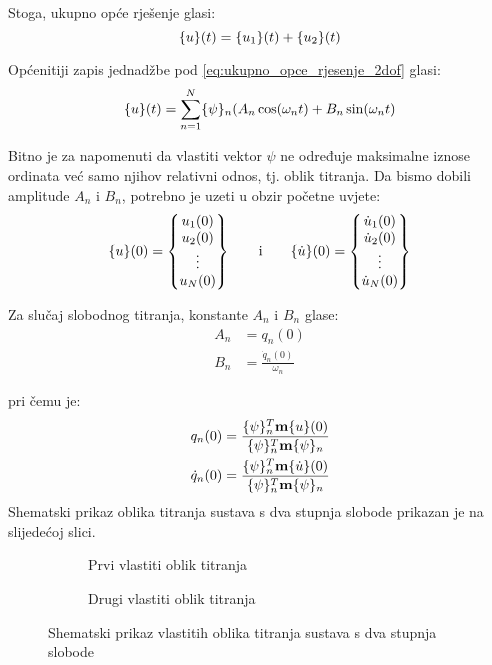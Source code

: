 Stoga, ukupno opće rješenje glasi:
\begin{equation}\label{eq:ukupno_opce_rjesenje_2dof}
    \vtor{u}{}(t)=\vtor{u_1}{}(t)+\vtor{u_2}{}(t) 
\end{equation}

Općenitiji zapis jednadžbe pod \eqref{eq:ukupno_opce_rjesenje_2dof} glasi:
\begin{equation}\label{eq:ukupno_opce_rjesenje_mdof}
    \vtor{u}{}(t)=\sum_{n=1}^N \vtor{\psi}{}_n (A_n\cos(\omega_nt) + B_n\sin(\omega_nt)
\end{equation}

\newpage
Bitno je za napomenuti da vlastiti vektor $\psi$ ne određuje maksimalne iznose
ordinata već samo njihov relativni odnos, tj. oblik titranja. Da
bismo dobili amplitude $A_n$ i $B_n$, potrebno je uzeti u obzir početne uvjete:
\begin{equation}
    \vtor{u}{}(0)  = \begin{Bmatrix} u_1(0)\\ u_2(0)\\ \vdots\\ u_N(0) \end{Bmatrix}
    \qquad \text{i} \qquad
    \vtor{u}{.}(0) = \begin{Bmatrix} \dot{u}_1(0)\\ \dot{u}_2(0)\\ \vdots\\ \dot{u}_N(0) \end{Bmatrix}
\end{equation}

Za slučaj slobodnog titranja, konstante $A_n$ i $B_n$ glase:
\begin{align}
    A_n&=q_n(0)\\
    B_n&=\frac{\dot{q}_n(0)}{\omega_n}
\end{align}

pri čemu je:
\begin{align*}
    q_n(0) &= \frac{\vtor{\psi}{}_n^T \mm \vtor{u}{}(0)}{\vtor{\psi}{}_n^T \mm \vtor{\psi}{}_n}\\
    \dot{q}_n(0) &= \frac{\vtor{\psi}{}_n^T \mm \vtor{u}{.}(0)}{\vtor{\psi}{}_n^T \mm \vtor{\psi}{}_n}
\end{align*}
Shematski prikaz oblika titranja sustava s dva stupnja slobode prikazan je na slijedećoj
slici.
\begin{figure}[H]
    \centering
    \begin{subfigure}[b]{0.4\textwidth}
        \centering
        
        \caption{Prvi vlastiti oblik titranja}
    \end{subfigure}
    \begin{subfigure}[b]{0.4\textwidth}
        \centering
        
        \caption{Drugi vlastiti oblik titranja}
    \end{subfigure}
    \caption{Shematski prikaz vlastitih oblika titranja sustava s dva stupnja slobode}
\end{figure}
